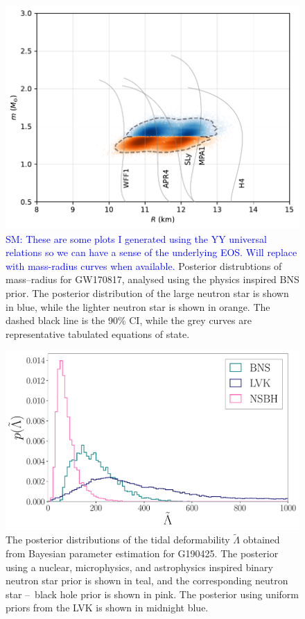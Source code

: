 \documentclass[twocolumn]{aastex631}
\newcommand{\SM}[1]{\textcolor{blue}{SM: #1}}
\begin{document}
\begin{figure}
	\centering
	\includegraphics[width=\linewidth]{GW170817_mass_radius_universalrel.pdf}
	\caption{\SM{These are some plots I generated using the YY universal relations so we can have a sense of the underlying EOS. Will replace with  mass-radius curves when available.} Posterior distrubtions of mass--radius for GW170817, analysed using the physics inspired BNS prior. The posterior distribution of the large neutron star is shown in blue, while the lighter neutron star is shown in orange. The dashed black line is the 90\% CI, while the grey curves are representative tabulated equations of state.  }
	\label{fig:GW170817_massradius}
\end{figure}
	
\begin{figure}
		\centering
		\includegraphics[width=1.\linewidth]{Fig_3_GW190425_lambda_tilde_posteriors.pdf}
		\caption{The posterior distributions of the tidal deformability $\tilde{\Lambda}$ obtained from Bayesian parameter estimation for G190425. The posterior using a nuclear, microphysics, and astrophysics inspired binary neutron star prior is shown in teal, and the corresponding neutron star --~black hole prior is shown in pink. 
			The posterior using uniform priors from the LVK is shown in midnight blue. }
		\label{fig:GW190425_tides}
\end{figure}
\end{document}
